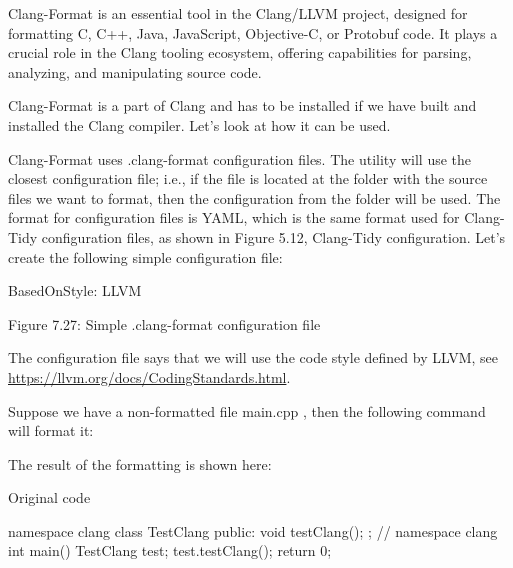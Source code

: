 Clang-Format is an essential tool in the Clang/LLVM project, designed for formatting C, C++, Java, JavaScript, Objective-C, or Protobuf code. It plays a crucial role in the Clang tooling ecosystem, offering capabilities for parsing, analyzing, and manipulating source code.

Clang-Format is a part of Clang and has to be installed if we have built and installed the Clang compiler. Let’s look at how it can be used.


Clang-Format uses .clang-format configuration files. The utility will use the closest configuration file; i.e., if the file is located at the folder with the source files we want to format, then the configuration from the folder will be used. The format for configuration files is YAML, which is the same format used for Clang-Tidy configuration files, as shown in Figure 5.12, Clang-Tidy configuration. Let’s create the following simple configuration file:

\begin{shell}
BasedOnStyle: LLVM
\end{shell}

\begin{center}
Figure 7.27: Simple .clang-format configuration file
\end{center}

The configuration file says that we will use the code style defined by LLVM, see \url{https://llvm.org/docs/CodingStandards.html}.

Suppose we have a non-formatted file main.cpp , then the following command will format it:


The result of the formatting is shown here:

\begin{cpp}
namespace clang {
class TestClang {
public:
  void testClang(){};
};
int main() {
  TestClang test;
  test.testClang();
  return 0;
}
\end{cpp}

Original code

\begin{cpp}
namespace clang {
class TestClang {
public:
  void testClang(){};
};
} // namespace clang
int main() {
  TestClang test;
  test.testClang();
  return 0;
}
\end{cpp}

